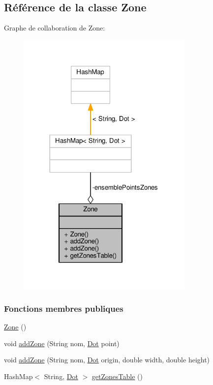 \hypertarget{classZone}{}\subsection{Référence de la classe Zone}
\label{classZone}


Graphe de collaboration de Zone\+:\nopagebreak
\begin{figure}[H]
\begin{center}
\leavevmode
\includegraphics[width=245pt]{classZone__coll__graph}
\end{center}
\end{figure}
\subsubsection*{Fonctions membres publiques}
\begin{DoxyCompactItemize}
\item 
\hyperlink{classZone_af7af31f0718d1e397f5828b3cd9654a9}{Zone} ()
\item 
void \hyperlink{classZone_adf06589b1830edc03c43536f84330a16}{add\+Zone} (String nom, \hyperlink{classDot}{Dot} point)
\item 
void \hyperlink{classZone_a5fce935febacf69fa389057cca4e3089}{add\+Zone} (String nom, \hyperlink{classDot}{Dot} origin, double width, double height)
\item 
Hash\+Map$<$ String, \hyperlink{classDot}{Dot} $>$ \hyperlink{classZone_a975f57d30d41bdaf5bdca42252118606}{get\+Zones\+Table} ()
\end{DoxyCompactItemize}
